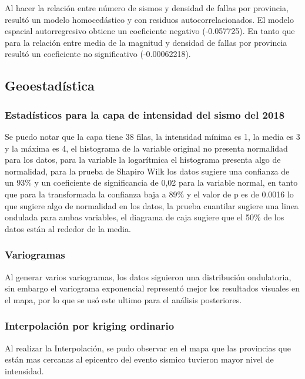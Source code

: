 \documentclass[11pt,]{article}
\begin{document}
Al hacer la relación entre número de sismos y densidad de fallas por
provincia, resultó un modelo homocedástico y con residuos
autocorrelacionados. El modelo espacial autorregresivo obtiene un
coeficiente negativo (-0.057725). En tanto que para la relación entre
media de la magnitud y densidad de fallas por provincia resultó un
coeficiente no significativo (-0.00062218).

\subsection{Geoestadística}\label{geoestaduxedstica}

\subsubsection{Estadísticos para la capa de intensidad del sismo del
2018}\label{estaduxedsticos-para-la-capa-de-intensidad-del-sismo-del-2018}

Se puedo notar que la capa tiene 38 filas, la intensidad mínima es 1, la
media es 3 y la máxima es 4, el histograma de la variable original no
presenta normalidad para los datos, para la variable la logarítmica el
histograma presenta algo de normalidad, para la prueba de Shapiro Wilk
los datos sugiere una confianza de un 93\% y un coeficiente de
significancia de 0,02 para la variable normal, en tanto que para la
transformada la confianza baja a 89\% y el valor de p es de 0.0016 lo
que sugiere algo de normalidad en los datos, la prueba cuantilar sugiere
una linea ondulada para ambas variables, el diagrama de caja sugiere que
el 50\% de los datos están al rededor de la media.

\subsubsection{Variogramas}\label{variogramas}

Al generar varios variogramas, los datos siguieron una distribución
ondulatoria, sin embargo el variograma exponencial representó mejor los
resultados visuales en el mapa, por lo que se usó este ultimo para el
análisis posteriores.

\subsubsection{Interpolación por kriging
ordinario}\label{interpolaciuxf3n-por-kriging-ordinario}

Al realizar la Interpolación, se pudo observar en el mapa que las
provincias que están mas cercanas al epicentro del evento sísmico
tuvieron mayor nivel de intensidad.
\end{document}
